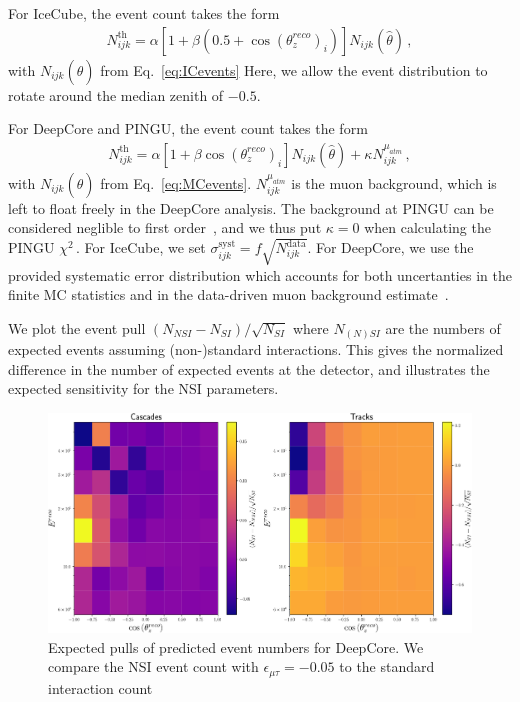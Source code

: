 \documentclass[draft=True]{revtex4-2}
\newcommand{\zreco}{\ensuremath{\cos{(\theta_z^{reco})}}}
\newcommand{\emt}{\ensuremath{\epsilon_{\mu\tau}}}
\begin{document}
For IceCube, the event count takes the form
\begin{align}
    N^\text{th}_{ijk} = \alpha\left[1+\beta (0.5 + \zreco_i )\right] N_{ijk}(\hat{\theta})\,,
\end{align}
with $N_{ijk}(\hat{\theta})$ from Eq.~\ref{eq:ICevents} Here, we allow the event distribution to rotate around the median zenith of $-0.5$.

For DeepCore and PINGU, the event count takes the form
\begin{align}
    N^\text{th}_{ijk} = \alpha\left[1+\beta \zreco_i \right] N_{ijk}(\hat{\theta}) + \kappa N_{ijk}^{\mu_{atm}}\,,
\end{align}
with $N_{ijk}(\hat{\theta})$ from Eq.~\ref{eq:MCevents}. $N_{ijk}^{\mu_{atm}}$ is the muon background, which is left to float freely in the DeepCore analysis.
The background at PINGU can be considered neglible to first order~\cite{PINGUdata}, and we thus put $\kappa=0$ when calculating the PINGU $\chi^2$\,.
For IceCube, we set $\sigma_{ijk}^\text{syst} = f\sqrt{N_{ijk}^\text{data}}$.
For DeepCore, we use the provided systematic error distribution which accounts for both uncertanties in the finite MC statistics and in the data-driven 
muon background estimate~\cite{DC2019data}.




We plot the event pull $(N_{NSI} - N_{SI})/\sqrt{N_{SI}}$ where $N_{(N)SI}$ are the numbers of expected events
assuming (non-)standard interactions. This gives the normalized difference in the
number of expected events at the detector, and illustrates the expected sensitivity for the NSI parameters.

\begin{figure}[!tb]
    \begin{center}
       \includegraphics[width=0.7\linewidth]{figures/DC_event_pulls.pdf}
    \end{center}
    \caption{Expected pulls of predicted event numbers for DeepCore. We compare the NSI event count with $\emt=-0.05$
     to the standard interaction count}\label{fig:DC_event_pulls}
 \end{figure}
\end{document}
